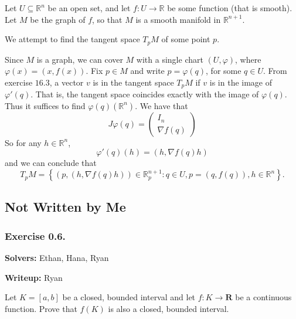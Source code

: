 \documentclass{article}
\newcommand{\R}{\mathbf{R}}
\theoremstyle{plain} %
\numberwithin{thm}{section} %
\theoremstyle{definition}
\begin{document}
    \medskip

    Let \(U \subseteq \mathbb{R}^n\) be an open set, and let \(f: U \to \mathbb{R}\) be some function (that is smooth). Let \(M\) be the graph of \(f\), so that \(M\) is a smooth manifold in \(\mathbb{R}^{n+1}\).

    We attempt to find the tangent space \(T_p M\) of some point \(p\).

    Since \(M\) is a graph, we can cover \(M\) with a single chart \((U, \varphi)\), where \(\varphi (x) = (x, f(x))\). Fix \(p \in M\) and write \(p = \varphi (q)\), for some \(q \in U\). From exercise \(16.3\), a vector \(v\) is in the tangent space \(T_p M\) if \(v\) is in the image of \(\varphi '(q)\). That is, the tangent space coincides exactly with the image of \(\varphi (q)\). Thus it suffices to find \(\varphi (q)(\mathbb{R}^{n})\). We have that
    \[
        J \varphi (q) = \left( \begin{array}{c}
            I_n \\
            \hline
            \nabla f(q)
        \end{array} \right) 
    \]
    So for any \(h \in \mathbb{R}^n\),
    \[
        \varphi '(q)(h) = (h, \nabla f(q)h)
    \]
    and we can conclude that
    \[
        T_p M = \left\{ (p, (h, \nabla f(q)h)) \in \mathbb{R}^{n+1}_p : q \in U, p = (q, f(q)), h \in \mathbb{R}^n \right\}.
    \]




    \subsection{Not Written by Me}
    \subsubsection{Exercise 0.6.}

    \textbf{Solvers:} Ethan, Hana, Ryan

    \textbf{Writeup:} Ryan

    Let \(K=[a,b]\) be a closed, bounded interval and let \(f:K\rightarrow \R\) be a continuous function. Prove that \(f(K)\) is also a closed, bounded interval.
\end{document}
